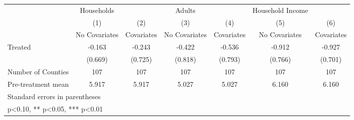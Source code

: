 {
\def\sym#1{\ifmmode^{#1}\else\(^{#1}\)\fi}
\begin{tabular}{l*{6}{c}}
\hline\hline
            &  Households   &               &      Adults   &               &Household Income   &               \\
            &\multicolumn{1}{c}{(1)}&\multicolumn{1}{c}{(2)}&\multicolumn{1}{c}{(3)}&\multicolumn{1}{c}{(4)}&\multicolumn{1}{c}{(5)}&\multicolumn{1}{c}{(6)}\\
            &\multicolumn{1}{c}{No Covariates}&\multicolumn{1}{c}{Covariates}&\multicolumn{1}{c}{No Covariates}&\multicolumn{1}{c}{Covariates}&\multicolumn{1}{c}{No Covariates}&\multicolumn{1}{c}{Covariates}\\
\hline
Treated     &      -0.163   &      -0.243   &      -0.422   &      -0.536   &      -0.912   &      -0.927   \\
            &     (0.669)   &     (0.725)   &     (0.818)   &     (0.793)   &     (0.766)   &     (0.701)   \\
\hline
Number of Counties&         107   &         107   &         107   &         107   &         107   &         107   \\
Pre-treatment mean&       5.917   &       5.917   &       5.027   &       5.027   &       6.160   &       6.160   \\
\hline\hline
\multicolumn{7}{l}{\footnotesize Standard errors in parentheses}\\
\multicolumn{7}{l}{\footnotesize * p<0.10, ** p<0.05, *** p<0.01}\\
\end{tabular}
}
